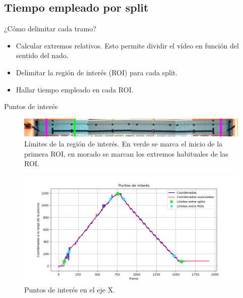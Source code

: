 \documentclass[11pt]{beamer}
\begin{document}
        \subsection{Tiempo empleado por split}
        \begin{frame}{¿Cómo delimitar cada tramo?}
            \begin{itemize}
                \item Calcular extremos relativos. Esto permite dividir el vídeo en función del sentido del nado.
                \item Delimitar la región de interés (ROI) para cada split. 
                \item Hallar tiempo empleado en cada ROI.
            \end{itemize}
        \end{frame}
        
        \begin{frame}{Puntos de interés}
        \begin{figure}
            \centering
            \includegraphics[scale=0.2]{imagenes/limites_ROI.png}
            \caption{Límites de la región de interés. En verde se marca el inicio de la primera ROI, en morado se marcan los extremos habituales de las ROI.}
            \label{fig:my_label}
        \end{figure}
            \begin{figure}
                \centering
                \includegraphics[scale=0.21]{imagenes/SENTID.png}
                \caption{Puntos de interés en el eje X.}
                \label{fig:puntosinteresx}
            \end{figure}
        \end{frame}
        
\end{document}
